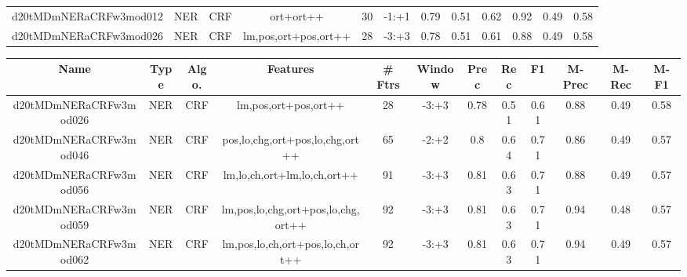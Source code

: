 \documentclass[a4paper]{article}
\begin{document}
\begin{landscape}
\begin{center}
\begin{tabular}{ |c|c|c|c|c|c|c|c|c|c|c|c|}
 
 	
 	\small{ d20tMDmNERaCRFw3mod012 } & \small{ NER} & \small{  CRF }  & ort+ort++  &  30 &  \small{  -1:+1 }  &  0.79 & 0.51 & 0.62  &  0.92 & 0.49 & 0.58 \\
 	

 
 	
 	\small{ d20tMDmNERaCRFw3mod026 } & \small{ NER} & \small{  CRF }  & lm,pos,ort+pos,ort++  &  28 &  \small{  -3:+3 }  &  0.78 & 0.51 & 0.61  &  0.88 & 0.49 & 0.58 \\
 	
 \hline
\end{tabular}
\end{center}




\begin{center}
\begin{tabular}{ |c|c|c|c|c|c|c|c|c|c|c|c|} 
 \hline
 	Name & Type & Algo. & Features & \# Ftrs & Window & Prec & Rec & F1 & M-Prec & M-Rec & M-F1\\
 \hline

 	

 
 	
 	\small{ d20tMDmNERaCRFw3mod026 } & \small{ NER} & \small{  CRF }  & lm,pos,ort+pos,ort++  &  28 &  \small{  -3:+3 }  &  0.78 & 0.51 & 0.61  &  0.88 & 0.49 & 0.58 \\
 	

 
 	
 	\small{ d20tMDmNERaCRFw3mod046 } & \small{ NER} & \small{  CRF }  & pos,lo,chg,ort+pos,lo,chg,ort++  &  65 &  \small{  -2:+2 }  &  0.8 & 0.64 & 0.71  &  0.86 & 0.49 & 0.57 \\
 	

 
 	
 	\small{ d20tMDmNERaCRFw3mod056 } & \small{ NER} & \small{  CRF }  & lm,lo,ch,ort+lm,lo,ch,ort++  &  91 &  \small{  -3:+3 }  &  0.81 & 0.63 & 0.71  &  0.88 & 0.49 & 0.57 \\
 	

 
 	
 	\small{ d20tMDmNERaCRFw3mod059 } & \small{ NER} & \small{  CRF }  & lm,pos,lo,chg,ort+pos,lo,chg,ort++  &  92 &  \small{  -3:+3 }  &  0.81 & 0.63 & 0.71  &  0.94 & 0.48 & 0.57 \\
 	

 
 	
 	\small{ d20tMDmNERaCRFw3mod062 } & \small{ NER} & \small{  CRF }  & lm,pos,lo,ch,ort+pos,lo,ch,ort++  &  92 &  \small{  -3:+3 }  &  0.81 & 0.63 & 0.71  &  0.94 & 0.49 & 0.57 \\
 	


\end{tabular}
\end{center}
\end{landscape}
\end{document}
